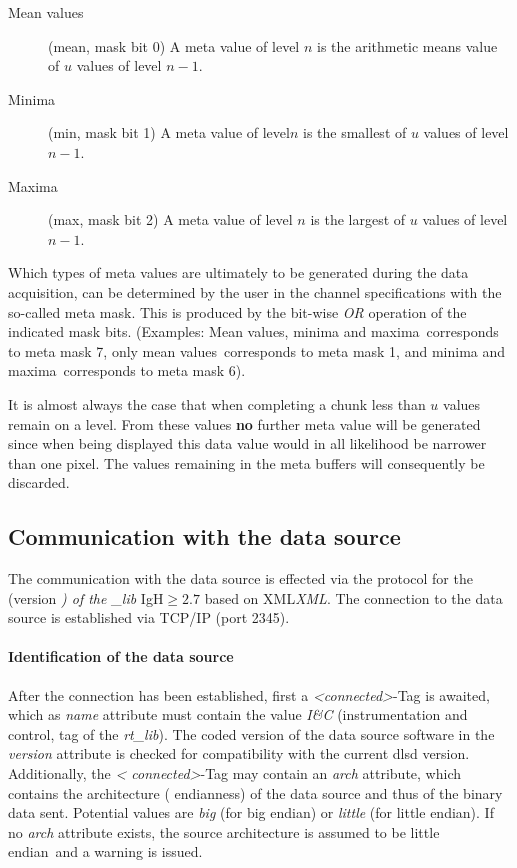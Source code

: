 \documentclass[a4paper,12pt,BCOR6mm,bibtotoc,idxtotoc]{scrbook}
\begin{document}
\begin{description} 
\item[Mean values] (\glqq mean\grqq, mask bit 0) A meta value of level $n$ is the arithmetic means value of $u$ values of level $n - 1$. 
\item[Minima] (\glqq min\grqq, mask bit 1) A meta value of level$n$ is the smallest of $u$ values of level $n - 1$. 
\item[Maxima] (\glqq max\grqq, mask bit 2) A meta value of level $n$ is the largest of $u$ values of level $n - 1$. \end{description}

Which types of meta values are ultimately to be generated during the data acquisition, can be determined by the user in the channel specifications with the so-called meta mask. This is produced by the bit-wise \textit{OR} operation of the indicated mask bits. (Examples: \glqq Mean values, minima and maxima\grqq\  corresponds to meta mask 7, \glqq only mean values\grqq\  corresponds to meta mask 1, and \glqq minima and maxima\grqq\ corresponds to meta mask 6).

It is almost always the case that when completing a chunk less than $u$ values remain on a level. From these values \textbf{no} further meta value will be generated since when being displayed this data value would in all likelihood be narrower than one pixel. The values remaining in the meta buffers will consequently be discarded.


\subsection{Communication with the data source} \label{sec:dlsd_logger_comm}

The communication with the data source is effected via the protocol for the (version \textit{) of the \_lib} IgH$\ge 2.7$ based on XML\textit{XML}. The connection to the data source is established via TCP/IP (port 2345).

\paragraph{Identification of the data source} After the connection has
been established, first a \textit{\textless connected\textgreater}-Tag
is awaited, which as \textit{name} attribute must contain the value
\textit{I\&C} (\glqq instrumentation and control\grqq, tag of the
\textit{rt\_lib}). The coded version of the data source software in
the \textit{version} attribute is checked for compatibility with the
current dlsd version. Additionally, the \textit{\textless
  connected\textgreater}-Tag may contain an \textit{arch} attribute,
which contains the architecture (\glqq
endianness\grqq{}) of the data source and thus of the
binary data sent. Potential values are \textit{big} (for \glqq big
endian\grqq) or \textit{little} (for \glqq little endian\grqq). If no
\textit{arch} attribute exists, the source architecture is assumed to
be \glqq little endian\grqq\ and a warning is issued.
\end{document}
